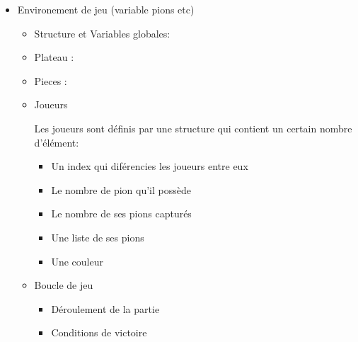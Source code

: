 \documentclass[10pt,a4paper,oneside]{report}
\begin{document}
\tableofcontents
\cleardoublepage













\begin{itemize}
    \item Environement de jeu (variable pions etc)
    \begin{itemize}
        \item Structure et Variables globales:
        
        \item Plateau :



        \item Pieces :
        \\
               
        \item Joueurs

        Les joueurs sont définis par une structure qui contient un certain nombre d'élément:
        \begin{itemize}
            \item Un index qui diférencies les joueurs entre eux
            \item Le nombre de pion qu'il possède
            \item Le nombre de ses pions capturés
            \item Une liste de ses pions
            \item Une couleur
        \end{itemize}
        \item Boucle de jeu
        \begin{itemize}
            \item Déroulement de la partie 
            \item Conditions de victoire
        \end{itemize}
    \end{itemize}


\end{itemize}
\end{document}
